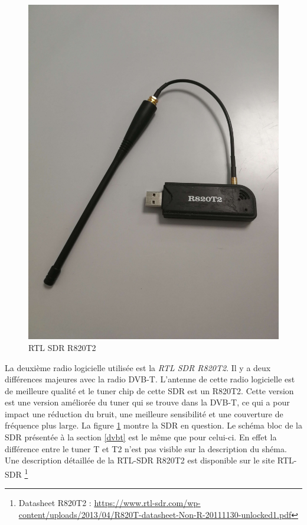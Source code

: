 \begin{figure}[h]
\centering

\includegraphics[scale=0.08]{images/r820t2.png}
\caption{RTL SDR R820T2}\label{term32}
\end{figure}

La deuxième radio logicielle utilisée est la \textit{RTL SDR R820T2}. Il y a deux différences majeures avec la radio \ac{DVB-T}. L'antenne de cette radio logicielle est de meilleure qualité et le tuner chip de cette SDR est un R820T2. Cette version est une version améliorée du tuner qui se trouve dans la \ac{DVB-T}, ce qui a pour impact une réduction du bruit, une meilleure sensibilité et une couverture de fréquence plus large. La figure \ref{term32} montre la SDR en question. Le schéma bloc de la SDR présentée à la section \ref{dvbt} est le même que pour celui-ci. En effet la différence entre le tuner T et T2 n'est pas visible sur la description du shéma. Une description détaillée de la RTL-SDR R820T2 est disponible sur le site RTL-SDR \footnote{Datasheet R820T2 : \href{https://www.rtl-sdr.com/wp-content/uploads/2013/04/R820T_datasheet-Non_R-20111130_unlocked1.pdf}{https://www.rtl-sdr.com/wp-content/uploads/2013/04/R820T-datasheet-Non-R-20111130-unlocked1.pdf}}



